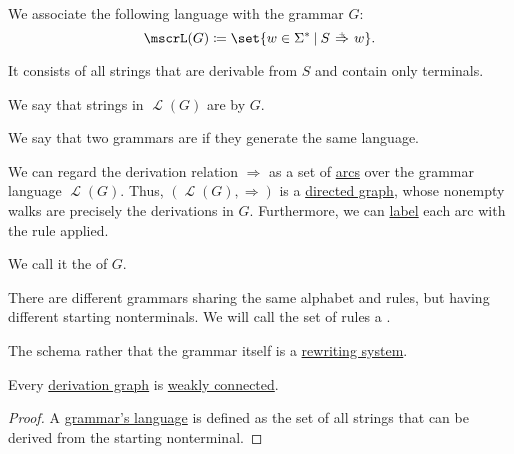 \begin{definition}
\begin{thmenum}
     We associate the following language with the grammar \( G \):
    \begin{equation*}
      \mscrL(G) \coloneqq \set{ w \in \Sigma^* \given S \reloset + \Rightarrow w }.
    \end{equation*}

    It consists of all strings that are derivable from \( S \) and contain only terminals.

    We say that strings in \( \mscrL(G) \) are  by \( G \).

     We say that two grammars are  if they generate the same language.

    \mimprovised We can regard the derivation relation \( \Rightarrow \) as a set of \hyperref[def:directed_graph/arcs]{arcs} over the grammar language \( \mscrL(G) \). Thus, \( (\mscrL(G), \Rightarrow) \) is a \hyperref[def:directed_graph]{directed graph}, whose nonempty walks are precisely the derivations in \( G \). Furthermore, we can \hyperref[def:labeled_set]{label} each arc with the rule applied.

    We call it the  of \( G \).

     There are different grammars sharing the same alphabet and rules, but having different starting nonterminals. We will call the set of rules a .

    The schema rather that the grammar itself is a \hyperref[def:rewriting_system]{rewriting system}.
  \end{thmenum}
\end{definition}

\begin{proposition}\label{thm:derivation_graph_connected}
  Every \hyperref[def:formal_grammar/graph]{derivation graph} is \hyperref[def:graph_connectedness/weak]{weakly connected}.
\end{proposition}
\begin{proof}
  A \hyperref[def:formal_grammar/language]{grammar's language} is defined as the set of all strings that can be derived from the starting nonterminal.
\end{proof}

